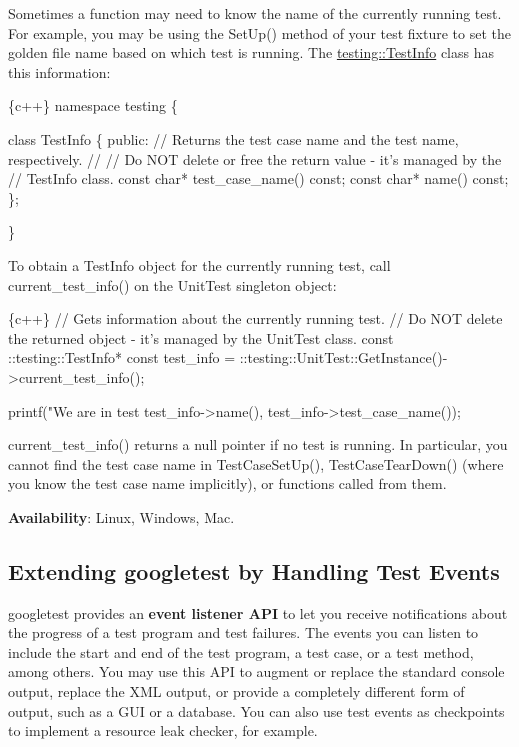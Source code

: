 Sometimes a function may need to know the name of the currently running test. For example, you may be using the {\ttfamily Set\+Up()} method of your test fixture to set the golden file name based on which test is running. The {\ttfamily \hyperlink{classtesting_1_1TestInfo}{testing\+::\+Test\+Info}} class has this information\+:


\begin{DoxyCode}
\{c++\}
namespace testing \{

class TestInfo \{
 public:
  // Returns the test case name and the test name, respectively.
  //
  // Do NOT delete or free the return value - it's managed by the
  // TestInfo class.
  const char* test\_case\_name() const;
  const char* name() const;
\};

\}
\end{DoxyCode}


To obtain a {\ttfamily Test\+Info} object for the currently running test, call {\ttfamily current\+\_\+test\+\_\+info()} on the {\ttfamily Unit\+Test} singleton object\+:


\begin{DoxyCode}
\{c++\}
  // Gets information about the currently running test.
  // Do NOT delete the returned object - it's managed by the UnitTest class.
  const ::testing::TestInfo* const test\_info =
    ::testing::UnitTest::GetInstance()->current\_test\_info();



  printf("We are in test %
         test\_info->name(),
         test\_info->test\_case\_name());
\end{DoxyCode}


{\ttfamily current\+\_\+test\+\_\+info()} returns a null pointer if no test is running. In particular, you cannot find the test case name in {\ttfamily Test\+Case\+Set\+Up()}, {\ttfamily Test\+Case\+Tear\+Down()} (where you know the test case name implicitly), or functions called from them.

{\bfseries Availability}\+: Linux, Windows, Mac.

\subsection*{Extending googletest by Handling Test Events}

googletest provides an {\bfseries event listener A\+PI} to let you receive notifications about the progress of a test program and test failures. The events you can listen to include the start and end of the test program, a test case, or a test method, among others. You may use this A\+PI to augment or replace the standard console output, replace the X\+ML output, or provide a completely different form of output, such as a G\+UI or a database. You can also use test events as checkpoints to implement a resource leak checker, for example.

